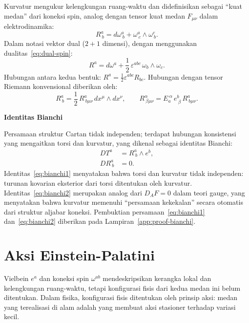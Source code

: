 Kurvatur mengukur kelengkungan ruang-waktu dan didefinisikan sebagai ``kuat medan'' dari koneksi spin, analog dengan tensor kuat medan $F_{\mu\nu}$ dalam elektrodinamika:
\begin{equation}\label{eq:curvature-tensor}
    R^a_{\ b} = d\omega^a_{\ b} + \omega^a_{\ c} \wedge \omega^c_{\ b}.
\end{equation}
Dalam notasi vektor dual ($2+1$ dimensi), dengan menggunakan dualitas~\eqref{eq:dual-spin}:
\begin{equation}\label{eq:curvature-vector}
    R^a = d\omega^a + \frac{1}{2}\, \varepsilon^{abc}\, \omega_b \wedge \omega_c.
\end{equation}
Hubungan antara kedua bentuk: $R^a = \frac{1}{2}\varepsilon^{abc}R_{bc}$. Hubungan dengan tensor Riemann konvensional diberikan oleh:
\begin{equation}\label{eq:riemann-components}
    R^a_{\ b} = \frac{1}{2}\, R^a_{\ b\mu\nu}\, dx^\mu \wedge dx^\nu, \qquad R^\alpha_{\ \beta\mu\nu} = E_a^{\ \alpha}\, e^b_{\ \beta}\, R^a_{\ b\mu\nu}.
\end{equation}


\vspace{0.5em}
\noindent \textbf{Identitas Bianchi}

Persamaan struktur Cartan tidak independen; terdapat hubungan konsistensi yang mengaitkan torsi dan kurvatur, yang dikenal sebagai identitas Bianchi:
\begin{align}
    DT^a &= R^a_{\ b} \wedge e^b, \label{eq:bianchi1} \\
    DR^a_{\ b} &= 0. \label{eq:bianchi2}
\end{align}
Identitas~\eqref{eq:bianchi1} menyatakan bahwa torsi dan kurvatur tidak independen: turunan kovarian eksterior dari torsi ditentukan oleh kurvatur. Identitas~\eqref{eq:bianchi2} merupakan analog dari $D_AF = 0$ dalam teori gauge, yang menyatakan bahwa kurvatur memenuhi ``persamaan kekekalan'' secara otomatis dari struktur aljabar koneksi. Pembuktian persamaan~\eqref{eq:bianchi1} dan~\eqref{eq:bianchi2} diberikan pada Lampiran~\ref{app:proof-bianchi}.

\section{Aksi Einstein-Palatini}
\label{sec:einstein-palatini}

Vielbein $e^a$ dan koneksi spin $\omega^{ab}$ mendeskripsikan kerangka lokal dan kelengkungan ruang-waktu, tetapi konfigurasi fisis dari kedua medan ini belum ditentukan. Dalam fisika, konfigurasi fisis ditentukan oleh prinsip aksi: medan yang terealisasi di alam adalah yang membuat aksi stasioner terhadap variasi kecil.

